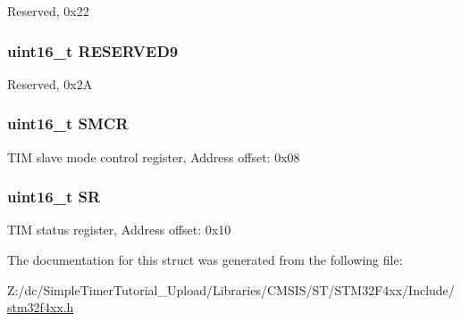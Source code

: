 Reserved, 0x22 \hypertarget{struct_t_i_m___type_def_ad8b1fadb520f7a200ee0046e110edc79}{
\subsubsection[{R\-E\-S\-E\-R\-V\-E\-D9}]{\setlength{\rightskip}{0pt plus 5cm}uint16\-\_\-t R\-E\-S\-E\-R\-V\-E\-D9}}\label{struct_t_i_m___type_def_ad8b1fadb520f7a200ee0046e110edc79}
Reserved, 0x2\-A \hypertarget{struct_t_i_m___type_def_a02758713abfe580460dd5bcd8762702a}{
\subsubsection[{S\-M\-C\-R}]{ uint16\-\_\-t S\-M\-C\-R}}\label{struct_t_i_m___type_def_a02758713abfe580460dd5bcd8762702a}
T\-I\-M slave mode control register, Address offset\-: 0x08 \hypertarget{struct_t_i_m___type_def_a44962ea5442d203bf4954035d1bfeb9d}{
\subsubsection[{S\-R}]{ uint16\-\_\-t S\-R}}\label{struct_t_i_m___type_def_a44962ea5442d203bf4954035d1bfeb9d}
T\-I\-M status register, Address offset\-: 0x10 

The documentation for this struct was generated from the following file\-:\begin{DoxyCompactItemize}
\item 
Z\-:/dc/\-Simple\-Timer\-Tutorial\-\_\-\-Upload/\-Libraries/\-C\-M\-S\-I\-S/\-S\-T/\-S\-T\-M32\-F4xx/\-Include/\hyperlink{stm32f4xx_8h}{stm32f4xx.\-h}\end{DoxyCompactItemize}

